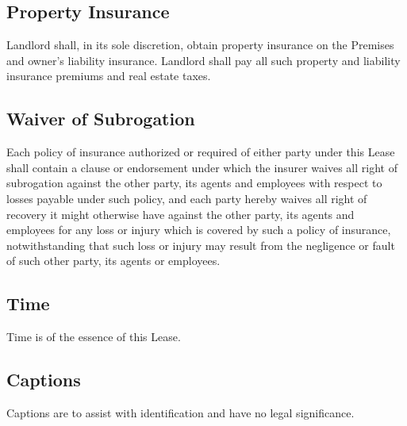 \documentclass{article}
\begin{document}
\subsection{Property Insurance}
Landlord shall, in its sole discretion, obtain property insurance on the
Premises and owner’s liability insurance. Landlord shall pay all such property
and liability insurance premiums and real estate taxes.

\subsection{Waiver of Subrogation}
Each policy of insurance authorized or required of either party under this Lease
shall contain a clause or endorsement under which the insurer waives all right
of subrogation against the other party, its agents and employees with respect to
losses payable under such policy, and each party hereby waives all right of
recovery it might otherwise have against the other party, its agents and
employees for any loss or injury which is covered by such a policy of insurance,
notwithstanding that such loss or injury may result from the negligence or fault
of such other party, its agents or employees.

\subsection{Time}
Time is of the essence of this Lease.

\subsection{Captions}
Captions are to assist with identification and have no legal significance.

\end{document}
